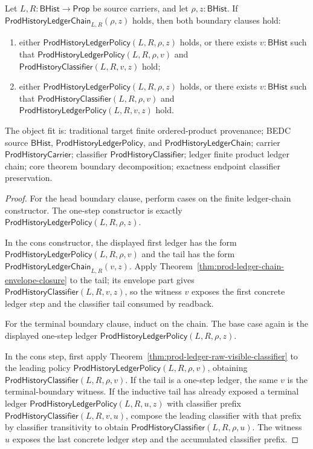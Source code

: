\begin{theorem}
\label{thm:prod-ledger-chain-boundary-classifier-decomposition}
Let $L,R:\mathsf{BHist}\to\mathsf{Prop}$ be source carriers, and let
$\rho,z:\mathsf{BHist}$. If
$\mathsf{ProdHistoryLedgerChain}_{L,R}(\rho,z)$ holds, then both boundary
clauses hold:
\begin{enumerate}
  \item either $\mathsf{ProdHistoryLedgerPolicy}(L,R,\rho,z)$ holds, or there
  exists $v:\mathsf{BHist}$ such that
  $\mathsf{ProdHistoryLedgerPolicy}(L,R,\rho,v)$ and
  $\mathsf{ProdHistoryClassifier}(L,R,v,z)$ hold;
  \item either $\mathsf{ProdHistoryLedgerPolicy}(L,R,\rho,z)$ holds, or there
  exists $v:\mathsf{BHist}$ such that
  $\mathsf{ProdHistoryClassifier}(L,R,\rho,v)$ and
  $\mathsf{ProdHistoryLedgerPolicy}(L,R,v,z)$ hold.
\end{enumerate}
The object fit is: traditional target finite ordered-product provenance; BEDC
source $\mathsf{BHist}$,
$\mathsf{ProdHistoryLedgerPolicy}$, and
$\mathsf{ProdHistoryLedgerChain}$; carrier
$\mathsf{ProdHistoryCarrier}$; classifier
$\mathsf{ProdHistoryClassifier}$; ledger finite product ledger chain; core
theorem boundary decomposition; exactness endpoint classifier preservation.
\end{theorem}
\begin{proof}
For the head boundary clause, perform cases on the finite ledger-chain
constructor. The one-step constructor is exactly
$\mathsf{ProdHistoryLedgerPolicy}(L,R,\rho,z)$.

In the cons constructor, the displayed first ledger has the form
$\mathsf{ProdHistoryLedgerPolicy}(L,R,\rho,v)$ and the tail has the form
$\mathsf{ProdHistoryLedgerChain}_{L,R}(v,z)$. Apply
Theorem~\ref{thm:prod-ledger-chain-envelope-closure} to the tail; its envelope
part gives $\mathsf{ProdHistoryClassifier}(L,R,v,z)$, so the witness $v$
exposes the first concrete ledger step and the classifier tail consumed by
readback.

For the terminal boundary clause, induct on the chain. The base case again is
the displayed one-step ledger
$\mathsf{ProdHistoryLedgerPolicy}(L,R,\rho,z)$.

In the cons step, first apply
Theorem~\ref{thm:prod-ledger-raw-visible-classifier} to the leading policy
$\mathsf{ProdHistoryLedgerPolicy}(L,R,\rho,v)$, obtaining
$\mathsf{ProdHistoryClassifier}(L,R,\rho,v)$. If the tail is a one-step ledger,
the same $v$ is the terminal-boundary witness. If the inductive tail has already
exposed a terminal ledger
$\mathsf{ProdHistoryLedgerPolicy}(L,R,u,z)$ with classifier prefix
$\mathsf{ProdHistoryClassifier}(L,R,v,u)$, compose the leading classifier with
that prefix by classifier transitivity to obtain
$\mathsf{ProdHistoryClassifier}(L,R,\rho,u)$. The witness $u$ exposes the last
concrete ledger step and the accumulated classifier prefix.
\end{proof}

